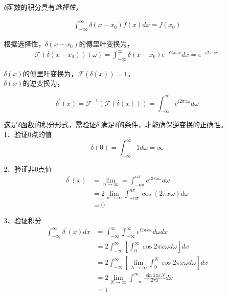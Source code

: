 		$\delta$函数的积分具有\textit{选择性}，

		\begin{align*}
			\int_{-\infty}^{\infty}\delta(x-x_0)f(x)dx = f(x_0)\label{delta_selection}
		\end{align*}

		根据选择性，$\delta(x-x_0)$的傅里叶变换为，
		\begin{align*}
			\mathcal{F}(\delta(x-x_0))(\omega) 
				= \int_{-\infty}^{\infty} \delta(x-x_0) e^{-i2\pi\omega x}dx
				= e^{-i2\pi\omega x_0}
		\end{align*}

		$\delta(x)$的傅里叶变换为，$\mathcal{F}(\delta(x)) = 1$。\\


		$\delta(x)$的逆变换为，

		\begin{equation}
			\delta^\prime(x) = \mathcal{F}^{-1}(\mathcal{F}(\delta(x))) = \int_{-\infty}^{\infty}e^{i2\pi x \omega}d{\omega}\label{delta_int_form}
		\end{equation}

		这是$\delta$函数的积分形式，需验证$\delta^\prime$满足$\delta$的条件，才能确保逆变换的正确性。\\

		1、验证$0$点的值
		$$
			\delta(0) = \int_{-\infty}^{\infty} 1 d\omega = \infty
		$$

		2、验证非$0$点值
			\begin{align*}
				\delta^\prime(x) 
					&= \lim_{n\rightarrow \infty} = \int_{-n\pi}^{n\pi}e^{i2\pi x \omega}d{\omega}\\
					&= 2\lim_{n\rightarrow \infty}\int_{-n\pi}^{n\pi} \cos (2\pi x \omega) d{\omega}\\
					&=0
			\end{align*}
		
		3、验证积分
		\begin{align*}
			\int_{-\infty}^{\infty} \delta^{\prime}(x) dx 
				&= \int_{-\infty}^{\infty}\int_{-\infty}^{\infty}e^{i2\pi x \omega}d{\omega}dx\\
				&= 2\int_{-\infty}^{\infty}\left[\int_{0}^{\infty} \cos 2\pi x\omega d{\omega}\right]dx\\
				&= 2\int_{-\infty}^{\infty}\left[\lim_{N\rightarrow \infty}\int_{0}^{N} \cos 2\pi x\omega d{\omega}\right]dx\\
				&= 2\lim_{N\rightarrow \infty}\int_{-\infty}^{\infty}\frac{\sin 2\pi x N}{2\pi x}dx\\
				&= 1
		\end{align*}

